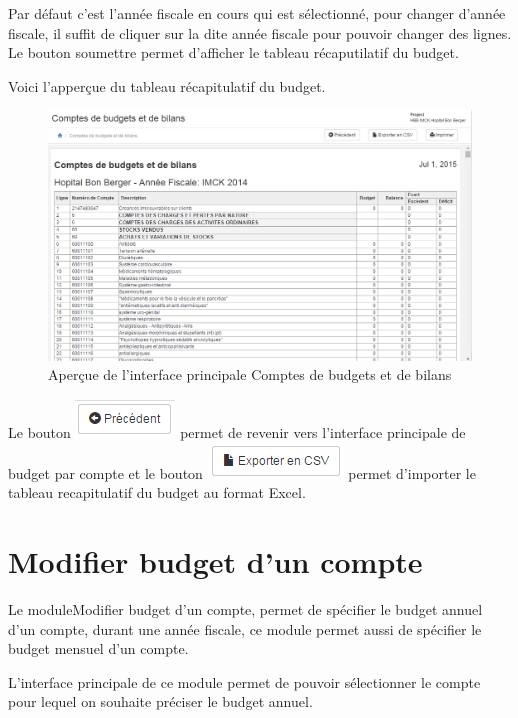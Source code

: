 \documentclass[12pt,a4paper]{report}
\begin{document}
Par défaut c'est l'année fiscale en cours qui est sélectionné, pour changer d'année fiscale, il suffit de cliquer sur la dite année fiscale pour pouvoir changer des lignes. Le bouton soumettre permet d'afficher le tableau récaputilatif du budget.

\newpage
Voici l'apperçue du tableau récapitulatif du budget.

\begin{figure}[h]
\begin{center}
\includegraphics[width=12cm]{pic/CompBudget.png}
\end{center}
\caption{Aperçue de l'interface principale Comptes de budgets et de bilans}
\label{Aperçue de l'interface principale Comptes de budgets et de bilans}
\end{figure}

Le bouton \includegraphics[scale=0.7]{pic/PrecedentBudget.png} permet de revenir vers l'interface principale de budget par compte et le bouton \includegraphics[scale=0.7]{pic/ExportCVS.png} permet d'importer le tableau recapitulatif du budget au format Excel.


\section{Modifier budget d'un compte}
Le moduleModifier budget d'un compte, permet de spécifier le budget annuel d'un compte, durant une année fiscale, ce module permet aussi de spécifier le budget mensuel d'un compte.

L'interface principale de ce module permet de pouvoir sélectionner le compte pour lequel on souhaite préciser le budget annuel.
\end{document}
